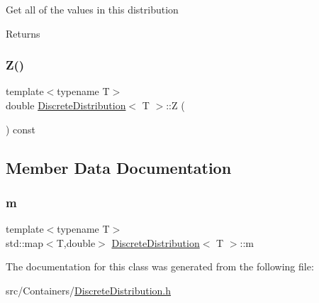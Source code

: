 Get all of the values in this distribution \begin{DoxyReturn}{Returns}

\end{DoxyReturn}
\mbox{\label{class_discrete_distribution_ad634a339172a69c006fded1beb423bb7}} 
\subsubsection{\texorpdfstring{Z()}{Z()}}
{\footnotesize\ttfamily template$<$typename T$>$ \\
double \hyperlink{class_discrete_distribution}{Discrete\+Distribution}$<$ T $>$\+::Z (\begin{DoxyParamCaption}{ }\end{DoxyParamCaption}) const\hspace{0.3cm}{\ttfamily [inline]}}



\subsection{Member Data Documentation}
\mbox{\label{class_discrete_distribution_a72a09b5b79a5bf0c55f780b9a81271fb}} 
\subsubsection{\texorpdfstring{m}{m}}
{\footnotesize\ttfamily template$<$typename T$>$ \\
std\+::map$<$T,double$>$ \hyperlink{class_discrete_distribution}{Discrete\+Distribution}$<$ T $>$\+::m}



The documentation for this class was generated from the following file\+:\begin{DoxyCompactItemize}
\item 
src/\+Containers/\hyperlink{_discrete_distribution_8h}{Discrete\+Distribution.\+h}\end{DoxyCompactItemize}
